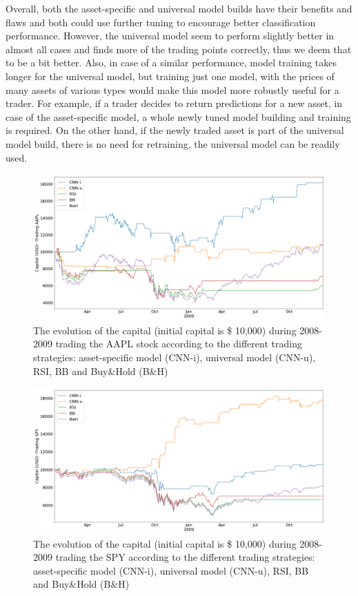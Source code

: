 \documentclass[12pt, a4paper]{article}
\begin{document}
Overall, both the asset-specific and universal model builds have their benefits and flaws and both could use further tuning to encourage better classification performance. However, the universal model seem to perform slightly better in almost all cases and finds more of the trading points correctly, thus we deem that to be a bit better. Also, in case of a similar performance, model training takes longer for the universal model, but training just one model, with the prices of many assets of various types would make this model more robustly useful for a trader. 
For example, if a trader decides to return predictions for a new asset, in case of the asset-specific model, a whole newly tuned model building and training is required. On the other hand, if the newly traded asset is part of the universal model build, there is no need for retraining, the universal model can be readily used.
\begin{figure}[H]
    \centering
    \includegraphics[width=\textwidth]{images/capitals/Capitals2_AAPL.png}
    \caption{The evolution of the capital (initial capital is \$ 10,000) during 2008-2009 trading the AAPL stock according to the different trading strategies: asset-specific model (CNN-i), universal model (CNN-u), RSI, BB and Buy\&Hold (B\&H)}
    \label{fig:AAPLcapevol}
\end{figure}
\begin{figure}[H]
    \centering
    \includegraphics[width=\textwidth]{images/capitals/Capitals2_SPY.png}
    \caption{The evolution of the capital (initial capital is \$ 10,000) during 2008-2009 trading the SPY according to the different trading strategies: asset-specific model (CNN-i), universal model (CNN-u), RSI, BB and Buy\&Hold (B\&H)}
    \label{fig:SPYcapevol}
\end{figure}
\end{document}
